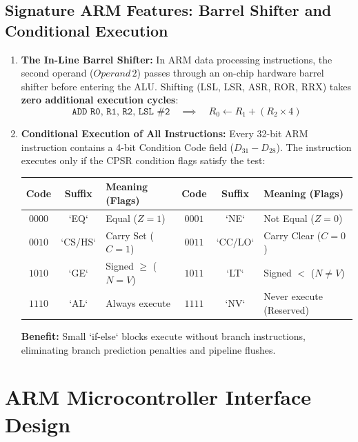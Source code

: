 \documentclass[12pt,a4paper]{article}
\begin{document}
\subsection{Signature ARM Features: Barrel Shifter and Conditional Execution}
\begin{enumerate}[leftmargin=*]
  \item \textbf{The In-Line Barrel Shifter:}
  In ARM data processing instructions, the second operand ($Operand\,2$) passes through an on-chip hardware barrel shifter before entering the ALU. Shifting (LSL, LSR, ASR, ROR, RRX) takes \textbf{zero additional execution cycles}:
  \[
  \texttt{ADD R0, R1, R2, LSL \#2} \quad \implies \quad R_0 \leftarrow R_1 + (R_2 \times 4)
  \]
  \item \textbf{Conditional Execution of All Instructions:}
  Every 32-bit ARM instruction contains a 4-bit Condition Code field ($D_{31}-D_{28}$). The instruction executes only if the CPSR condition flags satisfy the test:
  \par\vspace{4pt}
  \centering
  \begin{tabular}{|c|c|l|c|c|l|}
  \hline
  \textbf{Code} & \textbf{Suffix} & \textbf{Meaning (Flags)} & \textbf{Code} & \textbf{Suffix} & \textbf{Meaning (Flags)} \\ \hline
  $0000$ & `EQ` & Equal ($Z=1$) & $0001$ & `NE` & Not Equal ($Z=0$) \\ \hline
  $0010$ & `CS/HS` & Carry Set ($C=1$) & $0011$ & `CC/LO` & Carry Clear ($C=0$) \\ \hline
  $1010$ & `GE` & Signed $\ge$ ($N=V$) & $1011$ & `LT` & Signed $<$ ($N \ne V$) \\ \hline
  $1110$ & `AL` & Always execute & $1111$ & `NV` & Never execute (Reserved) \\ \hline
  \end{tabular}
  \par\vspace{4pt}\raggedright
  \textbf{Benefit:} Small `if-else` blocks execute without branch instructions, eliminating branch prediction penalties and pipeline flushes.
\end{enumerate}

\section{ARM Microcontroller Interface Design}
\end{document}
